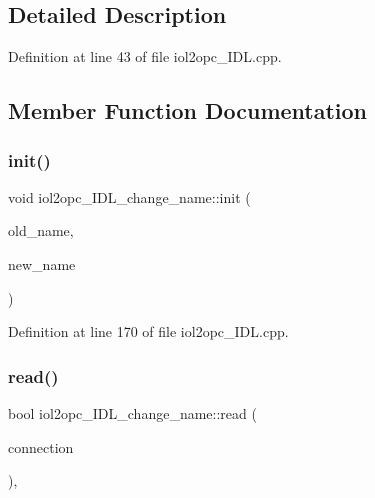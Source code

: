 \subsection{Detailed Description}


Definition at line 43 of file iol2opc\+\_\+\+I\+D\+L.\+cpp.



\subsection{Member Function Documentation}
\mbox{\label{classiol2opc__IDL__change__name_a395eebcf24fec14b5575757521ef903c}} 
\subsubsection{\texorpdfstring{init()}{init()}}
{\footnotesize\ttfamily void iol2opc\+\_\+\+I\+D\+L\+\_\+change\+\_\+name\+::init (\begin{DoxyParamCaption}\item[{const std\+::string \&}]{old\+\_\+name,  }\item[{const std\+::string \&}]{new\+\_\+name }\end{DoxyParamCaption})}



Definition at line 170 of file iol2opc\+\_\+\+I\+D\+L.\+cpp.

\mbox{\label{classiol2opc__IDL__change__name_a2b2895ab40418d48050ebb16d71f6ab3}} 
\subsubsection{\texorpdfstring{read()}{read()}}
{\footnotesize\ttfamily bool iol2opc\+\_\+\+I\+D\+L\+\_\+change\+\_\+name\+::read (\begin{DoxyParamCaption}\item[{yarp\+::os\+::\+Connection\+Reader \&}]{connection }\end{DoxyParamCaption})\hspace{0.3cm}{\ttfamily [override]}, {\ttfamily [virtual]}}



